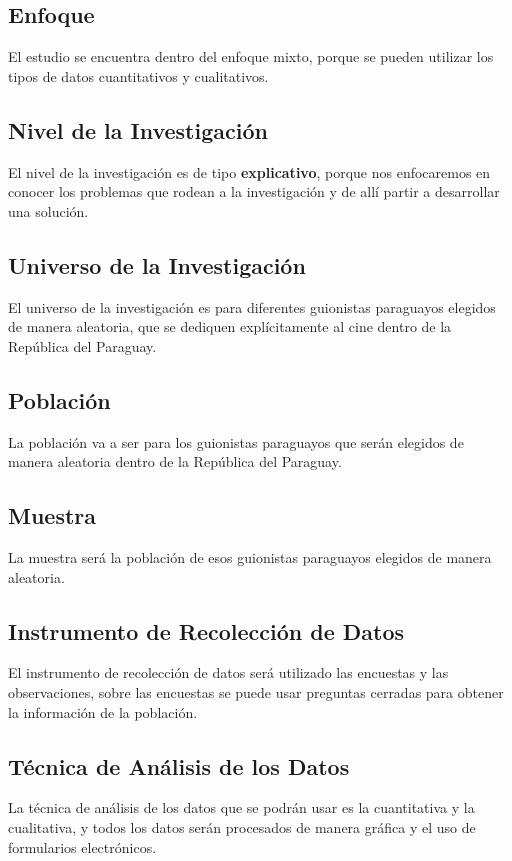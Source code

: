 \documentclass[12pt]{article}
\begin{document}
	\subsection{Enfoque}

	El estudio se encuentra dentro del enfoque mixto, porque se pueden utilizar los tipos de datos cuantitativos y cualitativos.

	\subsection{Nivel de la Investigación}

	El nivel de la investigación es de tipo \textbf{explicativo}, porque nos enfocaremos en conocer los problemas que rodean a la investigación y de allí partir a desarrollar una solución.

	\subsection{Universo de la Investigación}

	El universo de la investigación es para diferentes guionistas paraguayos elegidos de manera aleatoria, que se dediquen explícitamente al cine dentro de la República del Paraguay.

	\subsection{Población}

	La población va a ser para los guionistas paraguayos que serán elegidos de manera aleatoria dentro de la República del Paraguay.

	\subsection{Muestra}

	La muestra será la población de esos guionistas paraguayos elegidos de manera aleatoria.

	\subsection{Instrumento de Recolección de Datos}

	El instrumento de recolección de datos será utilizado las encuestas y las observaciones, sobre las encuestas se puede usar preguntas cerradas para obtener la información de la población.

	\subsection{Técnica de Análisis de los Datos}

	La técnica de análisis de los datos que se podrán usar es la cuantitativa y la cualitativa, y todos los datos serán procesados de manera gráfica y el uso de formularios electrónicos.

	\printbibliography{}
\end{document}
